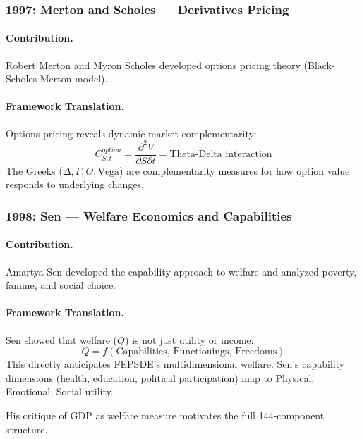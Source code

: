 \documentclass[12pt,a4paper]{article}
\begin{document}
\subsubsection{1997: Merton and Scholes --- Derivatives Pricing}

\paragraph{Contribution.}
Robert Merton and Myron Scholes developed options pricing theory
(Black-Scholes-Merton model).

\paragraph{Framework Translation.}
Options pricing reveals dynamic market complementarity:
\begin{equation}
  C^{option}_{S,t} = \frac{\partial^2 V}{\partial S \partial t} = \text{Theta-Delta interaction}
\end{equation}
The Greeks ($\Delta, \Gamma, \Theta, \text{Vega}$) are complementarity measures
for how option value responds to underlying changes.

\subsubsection{1998: Sen --- Welfare Economics and Capabilities}

\paragraph{Contribution.}
Amartya Sen \citep{sen1999} developed the capability approach to welfare and
analyzed poverty, famine, and social choice.

\paragraph{Framework Translation.}
Sen showed that welfare ($Q$) is not just utility or income:
\begin{equation}
  Q = f(\text{Capabilities, Functionings, Freedoms})
\end{equation}
This directly anticipates FEPSDE's multidimensional welfare.
Sen's capability dimensions (health, education, political participation)
map to Physical, Emotional, Social utility.

His critique of GDP as welfare measure motivates the full 144-component structure.
\end{document}
